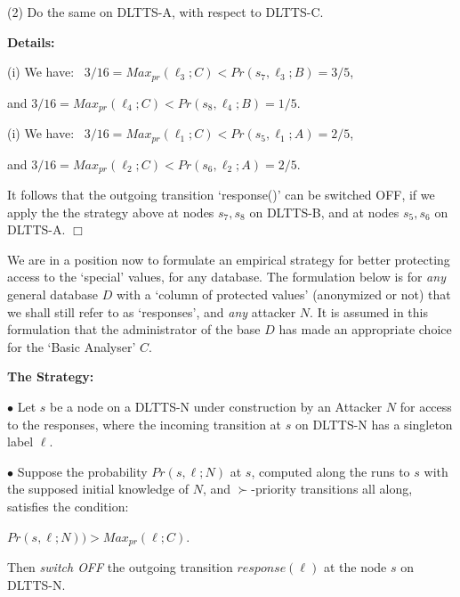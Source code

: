 \documentclass[pdflatex]{article}
\def \lft {\noindent}
\begin{document}
\lft        
(2)  Do the same on  DLTTS-A, with respect to DLTTS-C.

 \vspace*{2mm}\lft
 {\bf Details:}

 \lft
 (i) \hspace*{2mm} We have: \, $3/16 = Max_{pr}(\ell_3; C) <  Pr(s_7, \ell_3; B) = 3/5$, \par 
    \hspace*{1cm} and  \;\; $3/16 = Max_{pr}(\ell_4; C) <  Pr(s_8, \ell_4; B) = 1/5$. 

 \lft 
 (i) \hspace*{2mm} We have:  \, $3/16 = Max_{pr}(\ell_1; C) < Pr(s_5, \ell_1; A) = 2/5$,  \par 
 \hspace*{1cm} and \;\;  $3/16 = Max_{pr}(\ell_2; C)  < Pr(s_6, \ell_2;  A) = 2/5$.   
  
   \vspace*{1mm}
   It follows  that the outgoing transition `response()' can be   switched OFF, if we apply
   the    the strategy above  at nodes $s_7, s_8$ on DLTTS-B, and at nodes $s_5, s_6$
   on DLTTS-A.   \hfill$\Box$
      
 \vspace*{2mm}
    We are in a position  now  to formulate an empirical strategy  for better  protecting access
    to the `special' values, for any database.  The formulation below is for {\em any}
    general   database  $D$  with a `column of protected values' (anonymized or not) that
    we   shall still refer   to as `responses', and {\em any} attacker $N$.
   It is assumed in this formulation that  the   administrator of the base  $D$ has made an
   appropriate choice for the `Basic Analyser' $C$. 
      
    \vspace*{1mm}\lft
    {\bf The Strategy:} 
    
    $\bullet$ Let $s$ be a node on a DLTTS-N  under construction by an Attacker $N$ for access
    to the  responses,  where  the incoming transition at $s$ on DLTTS-N has a singleton label
    ${\ell}$. 
     
     $\bullet$ Suppose  the probability $Pr(s, \ell; N)$ at $s$, computed  along the runs to
      $s$ with the supposed initial knowledge of $N$, and $\succ$-priority transitions all along, 
     satisfies the condition: \par
     \hspace*{2.4cm} $ Pr(s, \ell; N)) >  Max_{pr}(\ell; C)$.  \par%
     Then {\em switch OFF} the  outgoing transition $response(\ell)$ at the node $s$ on
     DLTTS-N.
\end{document}
